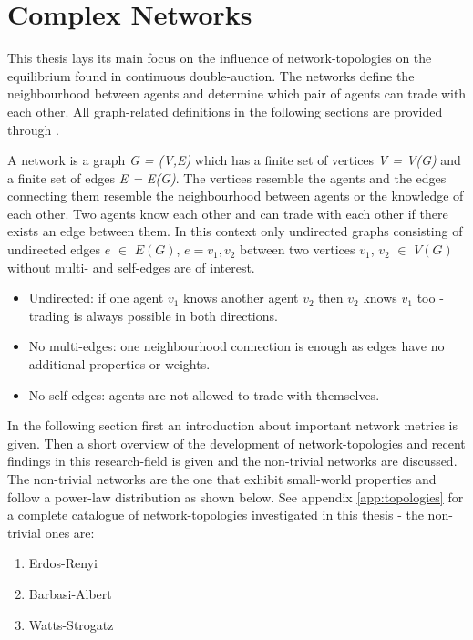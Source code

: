 \documentclass[../Bachelorarbeit.tex]{subfiles}
\begin{document}
\graphicspath{{./figures/theory/networks/}}	%

\section{Complex Networks}
\label{sec:theory_complexNetworks}
This thesis lays its main focus on the influence of network-topologies on the equilibrium found in continuous double-auction. The networks define the neighbourhood between agents and determine which pair of agents can trade with each other. All graph-related definitions in the following sections are provided through \cite{Drmota2007}.

\medskip

A network is a graph \textit{G = (V,E)} which has a finite set of vertices \textit{V = V(G)} and a finite set of edges \textit{E = E(G)}. The vertices resemble the agents and the edges connecting them resemble the neighbourhood between agents or the knowledge of each other. Two agents know each other and can trade with each other if there exists an edge between them. In this context only undirected graphs consisting of undirected edges $e$ $\in$ $E(G)$, $e = {v_1, v_2}$ between two vertices $v_1$, $v_2$ $\in$ $V(G)$ without multi- and self-edges are of interest.

\begin{itemize}
\item Undirected: if one agent $v_1$ knows another agent $v_2$ then $v_2$ knows $v_1$ too - trading is always possible in both directions.
\item No multi-edges: one neighbourhood connection is enough as edges have no additional properties or weights.
\item No self-edges: agents are not allowed to trade with themselves.
\end{itemize}
 
In the following section first an introduction about important network metrics is given. Then a short overview of the development of network-topologies and recent findings in this research-field is given and the non-trivial networks are discussed. The non-trivial networks are the one that exhibit small-world properties and follow a power-law distribution as shown below. See appendix \ref{app:topologies} for a complete catalogue of network-topologies investigated in this thesis - the non-trivial ones are:

\begin{enumerate}
\item Erdos-Renyi
\item Barbasi-Albert
\item Watts-Strogatz
\end{enumerate}
\end{document}
